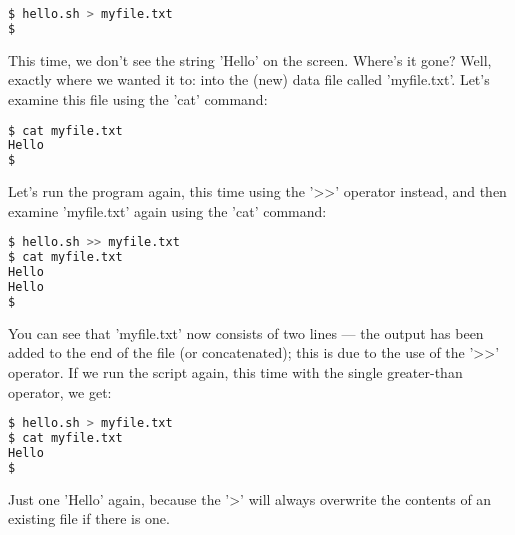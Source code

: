 \lstset{basicstyle=\scriptsize, numbers=left, captionpos=b, tabsize=4}
\begin{lstlisting}[caption=Redirecting the output to a data file,language={bash},
breaklines=true,xleftmargin=15pt,label=lst:Redirecting the output to a data file]
$ hello.sh > myfile.txt
$
\end{lstlisting}

This time, we don't see the string 'Hello' on the screen. Where's it gone?
Well, exactly where we wanted it to: into the (new) data file called
'myfile.txt'. Let's examine this file using the 'cat' command:


\lstset{basicstyle=\scriptsize, numbers=left, captionpos=b, tabsize=4}
\begin{lstlisting}[caption=Examining the results of redirecting some output,language={bash},
breaklines=true,xleftmargin=15pt,label=lst:Examining the results of redirecting some output]
$ cat myfile.txt
Hello
$
\end{lstlisting}

Let's run the program again, this time using the '\textgreater{}\textgreater{}'
operator instead, and then examine 'myfile.txt' again using the 'cat' command:


\lstset{basicstyle=\scriptsize, numbers=left, captionpos=b, tabsize=4}
\begin{lstlisting}[caption=Redirecting using the append redirect,language={bash},
breaklines=true,xleftmargin=15pt,label=lst:Redirecting using the append redirect]
$ hello.sh >> myfile.txt
$ cat myfile.txt
Hello
Hello
$
\end{lstlisting}

You can see that 'myfile.txt' now consists of two lines --- the output has been
added to the end of the file (or concatenated); this is due to the use of the
'\textgreater{}\textgreater{}' operator. If we run the script again, this time
with the single greater-than operator, we get:

\lstset{basicstyle=\scriptsize, numbers=left, captionpos=b, tabsize=4}
\begin{lstlisting}[caption=Redirecting using the overwrite redirect,language={bash},
breaklines=true,xleftmargin=15pt,label=lst:Redirecting using the overwrite redirect]
$ hello.sh > myfile.txt
$ cat myfile.txt
Hello
$
\end{lstlisting}

Just one 'Hello' again, because the '\textgreater{}' will always overwrite the
contents of an existing file if there is one.

